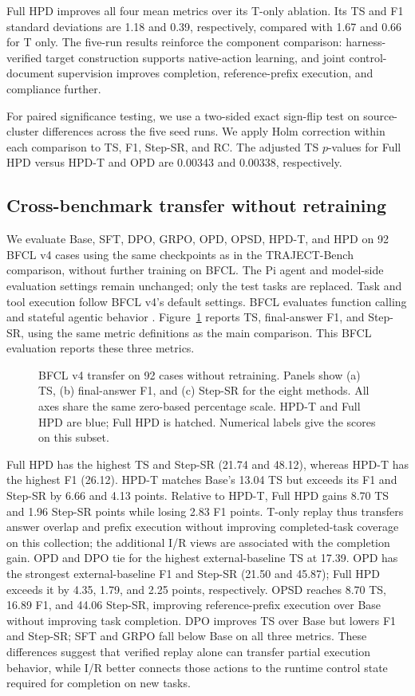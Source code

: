\documentclass{article}
\begin{document}
Full HPD improves all four mean metrics over its T-only ablation. Its
TS and F1 standard deviations are 1.18 and 0.39, respectively, compared
with 1.67 and 0.66 for T only. The five-run results reinforce the component
comparison: harness-verified target construction supports native-action
learning, and joint control-document supervision improves completion,
reference-prefix execution, and compliance further.

For paired significance testing, we use a two-sided exact sign-flip test on
source-cluster differences across the five seed runs. We apply Holm correction
within each comparison to TS, F1, Step-SR, and RC. The adjusted TS $p$-values
for Full HPD versus HPD-T and OPD are 0.00343 and 0.00338, respectively.

\FloatBarrier
\subsection{Cross-benchmark transfer without retraining}
\label{app:bfcl-ood}

We evaluate Base, SFT, DPO, GRPO, OPD, OPSD, HPD-T, and HPD on 92 BFCL v4 cases using
the same checkpoints as in the TRAJECT-Bench comparison, without further
training on BFCL. The Pi agent and model-side evaluation settings remain
unchanged; only the test tasks are replaced. Task and tool execution follow
BFCL v4's default settings. BFCL evaluates function calling and stateful
agentic behavior \citep{patil2025bfcl}. Figure~\ref{fig:bfcl-ood} reports TS,
final-answer F1, and Step-SR, using the same metric definitions as the main
comparison. This BFCL evaluation reports these three metrics.

\begin{figure}[!htbp]
\centering

\caption{BFCL v4 transfer on 92 cases without retraining. Panels show
(a) TS, (b) final-answer F1, and (c) Step-SR for the eight methods.
All axes share the same zero-based percentage scale. HPD-T and Full HPD are
blue; Full HPD is hatched. Numerical labels give the scores on this subset.}
\label{fig:bfcl-ood}
\end{figure}

Full HPD has the highest TS and Step-SR (21.74 and 48.12), whereas HPD-T has
the highest F1 (26.12). HPD-T matches Base's 13.04 TS but exceeds its F1 and
Step-SR by 6.66 and 4.13 points. Relative to HPD-T, Full HPD gains 8.70 TS
and 1.96 Step-SR points while losing 2.83 F1 points. T-only replay thus
transfers answer overlap and prefix execution without improving completed-task
coverage on this collection; the additional I/R views are associated with
the completion gain. OPD and DPO tie for the highest external-baseline TS at
17.39. OPD has the strongest external-baseline F1 and Step-SR (21.50 and
45.87); Full HPD exceeds it by 4.35, 1.79, and 2.25 points, respectively.
OPSD reaches 8.70 TS, 16.89 F1, and 44.06 Step-SR, improving reference-prefix
execution over Base without improving task completion. DPO improves TS over
Base but lowers F1 and Step-SR; SFT and GRPO fall below Base on all three
metrics. These differences suggest that verified replay alone can transfer
partial execution behavior, while I/R better connects those actions to the
runtime control state required for completion on new tasks.
\end{document}
